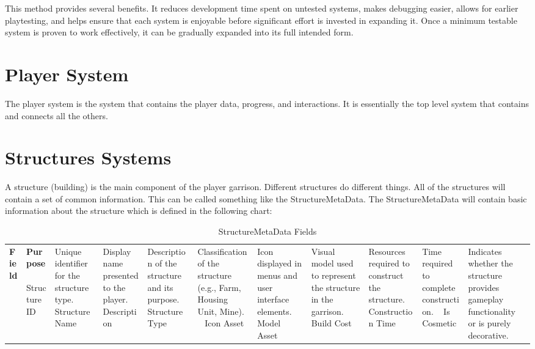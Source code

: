 This method provides several benefits. It reduces development time spent on untested systems, makes debugging easier, allows for earlier playtesting, and helps ensure that each system is enjoyable before significant effort is invested in expanding it. Once a minimum testable system is proven to work effectively, it can be gradually expanded into its full intended form.




\section{Player System}\label{Player System}

The player system is the system that contains the player data, progress, and interactions. It is essentially the top level system that contains and connects all the others.  







\section{Structures Systems}\label{Structures Systems}

A structure (building) is the main component of the player garrison. Different structures do different things. All of the structures will contain a set of common information. This can be called something like the StructureMetaData. The StructureMetaData will contain basic information about the structure which is defined in the following chart:

\begin{table}[htbp]
\centering
\caption{StructureMetaData Fields}
\label{tab}
\begin{tabular}{|p{4cm}|p{9cm}|}
\hline
\textbf{Field} & \textbf{Purpose} \
\hline
Structure ID & Unique identifier for the structure type. \
\hline
Structure Name & Display name presented to the player. \
\hline
Description & Description of the structure and its purpose. \
\hline
Structure Type & Classification of the structure (e.g., Farm, Housing Unit, Mine). \
\hline
Icon Asset & Icon displayed in menus and user interface elements. \
\hline
Model Asset & Visual model used to represent the structure in the garrison. \
\hline
Build Cost & Resources required to construct the structure. \
\hline
Construction Time & Time required to complete construction. \
\hline
Is Cosmetic & Indicates whether the structure provides gameplay functionality or is purely decorative. \
\hline
\end{tabular}
\end{table}

